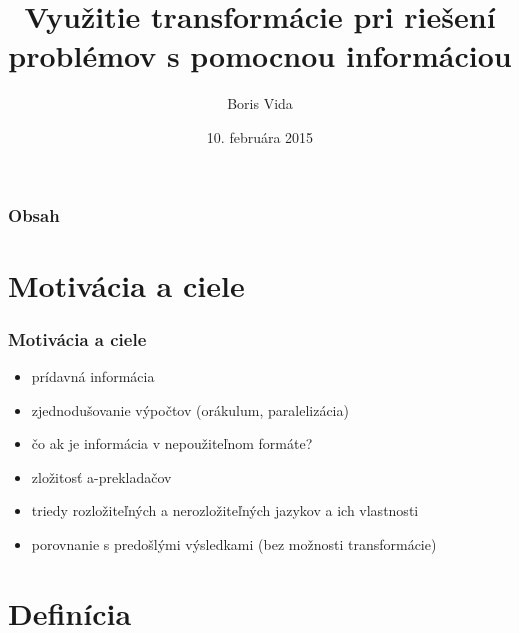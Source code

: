\documentclass[slovak]{beamer}
\title[Transformácia s pomocnou informáciou]{Využitie transformácie pri riešení problémov s pomocnou informáciou}
\author{Boris Vida}
\institute[FMFI UK]
{
Katedra informatiky, FMFI UK \\
\medskip
\textit{Prof. RNDr. Branislav Rovan, PhD.}
}
\date{10. februára 2015}
\begin{document}
\begin{frame}
\titlepage %
\end{frame}

\begin{frame}
\frametitle{Obsah}
\tableofcontents
\end{frame}

\section{Motivácia a ciele}

\begin{frame}
\frametitle{Motivácia a ciele}

\begin{itemize}
\item prídavná informácia
\item zjednodušovanie výpočtov (orákulum, paralelizácia)
\item čo ak je informácia v nepoužiteľnom formáte?
\item zložitosť a-prekladačov
\item triedy rozložiteľných a nerozložiteľných jazykov a ich vlastnosti
\item porovnanie s predošlými výsledkami (bez možnosti transformácie)
\end{itemize}

\end{frame}


\section{Definícia}
\end{document}

